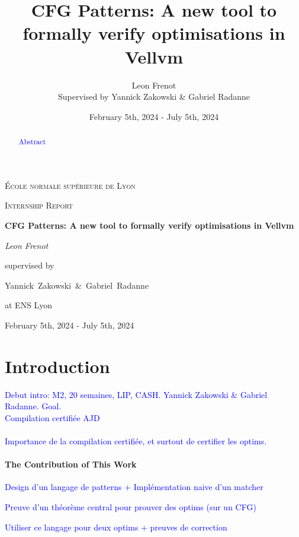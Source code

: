 \documentclass[11pt]{article}
\newcommand{\leon}[1]{\textcolor{blue}{#1}}
\begin{document}
\title{CFG Patterns: A new tool to formally verify optimisations in Vellvm}

\author{Leon Frenot\\ Supervised by Yannick Zakowski \& Gabriel Radanne}

\date{February 5th, 2024 - July 5th, 2024}

\begin{titlepage}
  \centering
  {\textsc{École normale supérieure de Lyon} \par}
  \vspace{1cm}
  {\Large \textsc{Internship Report}\par}
  \vspace{1.5cm}
  {\huge\bfseries CFG Patterns: A new tool to formally verify optimisations in Vellvm\par}
  \vspace{2cm}
  {\Large\itshape Leon Frenot\par}
  \vfill
  supervised by\par
  Yannick~Zakowski~\&~Gabriel~Radanne\par
  at ENS Lyon
  \vfill

  {\large February 5th, 2024 - July 5th, 2024\par}
\end{titlepage}


\tableofcontents
\newpage

\hypersetup{colorlinks=true, linkcolor=red}

\begin{abstract}
  \leon{Abstract}
\end{abstract}

\section*{Introduction}
\label{sec:intro}

\indent
\leon{Debut intro: M2, 20 semaines, LIP, CASH. Yannick Zakowski \& Gabriel Radanne. Goal.}\\

\leon{Compilation certifiée AJD}

\paragraph{}
\leon{Importance de la compilation certifiée, et surtout de certifier les optims.}


\paragraph{The Contribution of This Work}
\begin{description}
    \item \leon{Design d'un langage de patterns + Implémentation naive d'un matcher}
    \item \leon{Preuve d'un théorème central pour prouver des optims (sur un CFG)}
    \item \leon{Utiliser ce langage pour deux optims + preuves de correction}
\end{description}
\end{document}
